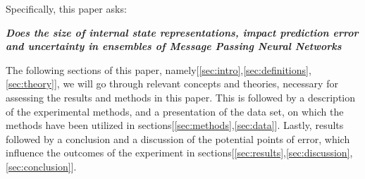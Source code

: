 Specifically, this paper asks:

\begin{center}
  \textbf{\textit{Does the size of internal state representations, impact prediction error and uncertainty in ensembles of
      Message Passing Neural Networks}}
\end{center}

The following sections of this paper, namely[\ref{sec:intro},\ref{sec:definitions},\ref{sec:theory}],
we will go through relevant concepts and theories, necessary for assessing the results and methods in this paper.
This is followed by a description of the experimental methods, and a presentation of the data set,
on which the methods have been utilized in sections[\ref{sec:methods},\ref{sec:data}].
Lastly, results followed by a conclusion and a discussion of the potential points of error,
which influence the outcomes of the experiment in sections[\ref{sec:results},\ref{sec:discussion},\ref{sec:conclusion}].

\newpage


